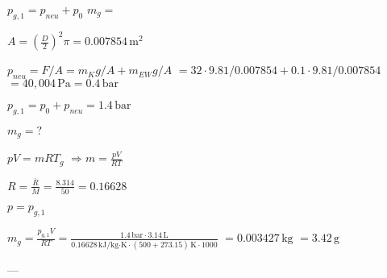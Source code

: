 \( p_{g,1} = p_{neu} + p_{0} \)  
\( m_g = \)  

\( A = \left( \frac{D}{2} \right)^2 \pi = 0.007854 \, \text{m}^2 \)  

\( p_{neu} = F / A = m_K g / A + m_{EW} g / A \)  
\( = 32 \cdot 9.81 / 0.007854 + 0.1 \cdot 9.81 / 0.007854 \)  
\( = 40,004 \, \text{Pa} = 0.4 \, \text{bar} \)  

\( p_{g,1} = p_0 + p_{neu} = 1.4 \, \text{bar} \)  

\( m_g = ? \)  

\( p V = m R T_g \)  
\( \Rightarrow m = \frac{p V}{R T} \)  

\( R = \frac{\overline{R}}{M} = \frac{8.314}{50} = 0.16628 \)  

\( p = p_{g,1} \)  

\( m_g = \frac{p_{g,1} V}{R T} = \frac{1.4 \, \text{bar} \cdot 3.14 \, \text{L}}{0.16628 \, \text{kJ/kg·K} \cdot (500 + 273.15) \, \text{K} \cdot 1000} \)  
\( = 0.003427 \, \text{kg} \)  
\( = 3.42 \, \text{g} \)  

---